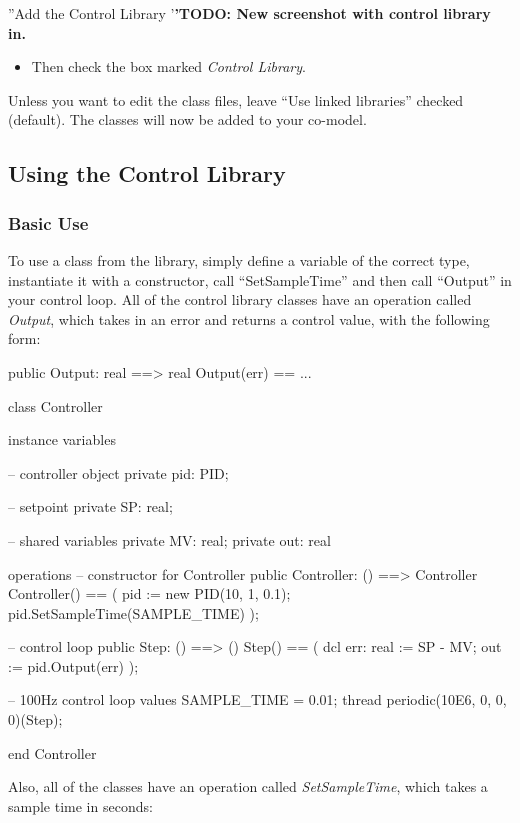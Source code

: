 \documentclass{crescendorepchap}
\begin{document}
''Add the Control Library '\textbf{'TODO: New screenshot with control
library in.}

\begin{itemize}
\item
  Then check the box marked \emph{Control Library}.
\end{itemize}

Unless you want to edit the class files, leave ``Use linked libraries''
checked (default). The classes will now be added to your co-model.

\subsection{Using the Control Library}

\subsubsection{Basic Use}

To use a class from the library, simply define a variable of the correct
type, instantiate it with a constructor, call ``SetSampleTime'' and then
call ``Output'' in your control loop. All of the control library classes
have an operation called \emph{Output}, which takes in an error and
returns a control value, with the following form:

\begin{vdmrt}
public Output: real ==> real
Output(err) == ...

class Controller

instance variables

-- controller object
private pid: PID;

-- setpoint
private SP: real;

-- shared variables
private MV: real;
private out: real

operations
-- constructor for Controller
public Controller: () ==> Controller
Controller() ==
(
pid := new PID(10, 1, 0.1);
pid.SetSampleTime(SAMPLE_TIME)
);

-- control loop
public Step: () ==> ()
Step() ==
(
dcl err: real := SP - MV;
out := pid.Output(err)
);

-- 100Hz control loop
values SAMPLE_TIME = 0.01;
thread periodic(10E6, 0, 0, 0)(Step);

end Controller
\end{vdmrt}

Also, all of the classes have an operation called \emph{SetSampleTime},
which takes a sample time in seconds:
\end{document}

